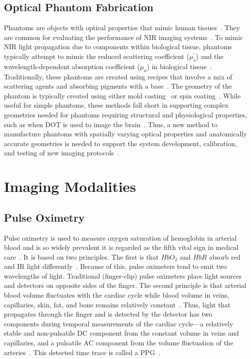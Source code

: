 \subsection{Optical Phantom Fabrication}
Phantoms are objects with optical properties that mimic human tissues~\cite{Pogue2006}. They are common for evaluating the performance of \ac{NIR} imaging systems~\cite{Pogue2006}. To mimic \ac{NIR} light propagation due to components within biological tissue, phantoms typically attempt to mimic the reduced scattering coefficient ($\mu_s^{'}$) and the wavelength-dependent absorption coefficient ($\mu_a$) in biological tissue~\cite{Dempsey2017}. Traditionally, these phantoms are created using recipes that involve a mix of scattering agents and absorbing pigments with a base~\cite{Hebden1995,Dong2015}. The geometry of the phantom is typically created using either mold casting~\cite{Hahn2012,Mobashsher2014} or spin coating~\cite{Park2013}. While useful for simple phantoms, these methods fall short in supporting complex geometries needed for phantoms requiring structural and physiological properties, such as when \ac{DOT} is used to image the brain~\cite{Hebden2002,Villringer1997}. Thus, a new method to manufacture phantoms with spatially varying optical properties and anatomically accurate geometries is needed to support the system development, calibration, and testing of new imaging protocols~\cite{Cerussi2012,Diep2015}.  


\section{Imaging Modalities}
\label{chap:background:modalities}
\subsection{Pulse Oximetry}
Pulse oximetry is used to measure oxygen saturation of hemoglobin in arterial blood and is so widely prevalent it is regarded as the fifth vital sign in medical care~\cite{Neff1988}. It is based on two principles. The first is that $HbO_2$ and $HbR$ absorb red and \ac{IR} light differently~\cite{Bohn2015}. Because of this, pulse oximeters tend to emit two wavelengths of light. Traditional (finger-clip) pulse oximeters place light sources and detectors on opposite sides of the finger. The second principle is that arterial blood volume fluctuates with the cardiac cycle while blood volume in veins, capillaries, skin, fat, and bone remains relatively constant~\cite{Sinex1999}. Thus, light that propagates through the finger and is detected by the detector has two components during temporal measurements of the cardiac cycle---a relatively stable and non-pulsatile \ac{DC} component from the constant volume in veins and capillaries, and a pulsatile \ac{AC} component from the volume fluctuation of the arteries~\cite{Lopez2012}. This detected time trace is called a \ac{PPG}~\cite{Sinex1999}. 

